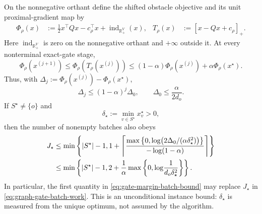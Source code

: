 \begin{theorem}
\label{thm:gate-objective-contraction}
On the nonnegative orthant define the shifted obstacle objective and its unit
proximal-gradient map by
\begin{align}
 \Phi_\rho(x)
 &:=\frac12x^\top Qx-c_\rho^\top x
    +\operatorname{ind}_{\mathbb R_+^V}(x),
 &T_\rho(x)&:=[x-Qx+c_\rho]_+.
 \label{eq:shifted-obstacle-objective}
\end{align}
Here $\operatorname{ind}_{\mathbb R_+^V}$ is zero on the nonnegative orthant
and $+\infty$ outside it.
At every nonterminal exact-gate stage,
\begin{equation}
 \Phi_\rho(x^{(j+1)})
 \leq \Phi_\rho(T_\rho(x^{(j)}))
 \leq
 (1-\alpha)\Phi_\rho(x^{(j)})
 +\alpha\Phi_\rho(x^\star).
 \label{eq:gate-objective-contraction}
\end{equation}
Thus, with
$\Delta_j:=\Phi_\rho(x^{(j)})-\Phi_\rho(x^\star)$,
\begin{equation}
 \Delta_j\leq(1-\alpha)^j\Delta_0,
 \qquad
 \Delta_0\leq\frac{\alpha}{2d_o}.
 \label{eq:gate-gap-geometric}
\end{equation}
If $S^\star\neq\{o\}$ and
\begin{equation}
 \delta_\star:=\min_{v\in S^\star}x_v^\star>0,
 \label{eq:active-coordinate-margin}
\end{equation}
then the number of nonempty batches also obeys
\begin{align}
 J_\star
 &\leq
 \min\left\{
 |S^\star|-1,
 1+\left\lceil
 \frac{
  \max\left\{0,\log\!\left(2\Delta_0/(\alpha\delta_\star^2)\right)\right\}}
 {-\log(1-\alpha)}
 \right\rceil
 \right\}
 \notag\\
 &\leq
 \min\left\{
 |S^\star|-1,
 2+\frac{1}{\alpha}
 \max\left\{0,\log\!\frac{1}{d_o\delta_\star^2}\right\}
 \right\}.
 \label{eq:gate-margin-batch-bound}
\end{align}
In particular, the first quantity in \cref{eq:gate-margin-batch-bound} may
replace $J_\star$ in \cref{eq:graph-gate-batch-work}.  This is an
unconditional instance bound: $\delta_\star$ is measured from the unique
optimum, not assumed by the algorithm.
\end{theorem}

